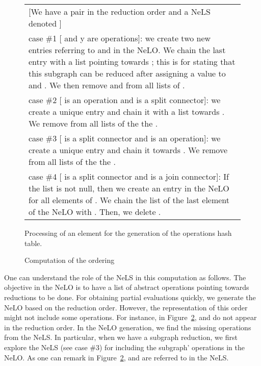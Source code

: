 \documentclass[a4paper]{article}
\begin{document}
\begin{figure}[!htbp] 
\begin{center}
\begin{tabular}{|p{13cm}|}
\hline 
\small [We have a pair  in the reduction order and a NeLS denoted ]\\
\small case \#1 [ and y are operations]: we create two new entries referring to  and  in the NeLO. 
We chain the last entry with a list pointing towards ; this is for stating that this subgraph 
can be reduced after assigning a value to  and . We then remove  and  from all lists of .\\
\small case \#2 [ is an operation and  is a split connector]: we create a unique entry  and chain it with a list 
towards . We remove  from all lists of the the . \\
\small case \#3 [ is a split connector and  is an operation]: we create a unique entry  and chain it towards 
. We remove  from all lists of the the .  \\
\small case \#4 [ is a split connector and  is a join connector]: If the list  is not null, then we 
create an entry in the NeLO for all elements of . We chain the list of the last element of the NeLO 
with . Then, we delete .  \\
\hline
\end{tabular}
\caption{Processing of an element  for the generation of the operations hash table.}
\label{Cases}
\end{center}
\end{figure}



\begin{figure}[htbp]
\centering
{}
\caption{Computation of the ordering}\label{dataStructureExample}
\end{figure}

One can understand the role of the NeLS in this computation as follows. The objective in the NeLO 
is to have a list of abstract operations pointing towards reductions to be done. For obtaining  
 partial evaluations quickly, we generate the NeLO based on the reduction order. However, the representation of 
this order might not include some operations. For instance, in Figure~\ref{dataStructureExample},  and  
do not appear in the reduction order. In the NeLO generation, we find the missing operations from the NeLS. 
In particular, when we have a subgraph reduction, we first explore the NeLS (see case \#3) for including 
the subgraph' operations in the NeLO. As one can remark in  Figure~\ref{dataStructureExample},  and  are 
referred to in the NeLS. 
\end{document}
